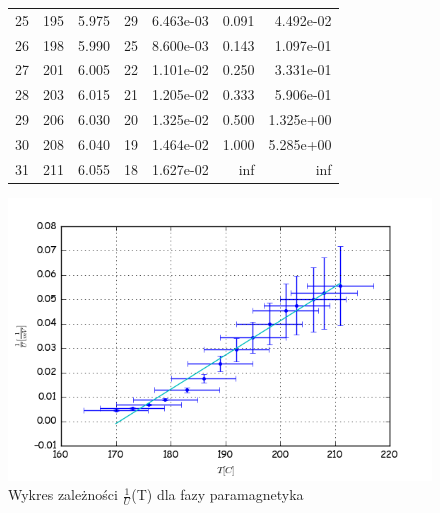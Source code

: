 \documentclass[a4paper,10pt]{article}
\begin{document}
\begin{figure}
\begin{tabular}{lrrrrrr}
25 &            195 &                  5.975 &                           29 &                           6.463e-03 &                                0.091 &                                   4.492e-02 \\
26 &            198 &                  5.990 &                           25 &                           8.600e-03 &                                0.143 &                                   1.097e-01 \\
27 &            201 &                  6.005 &                           22 &                           1.101e-02 &                                0.250 &                                   3.331e-01 \\
28 &            203 &                  6.015 &                           21 &                           1.205e-02 &                                0.333 &                                   5.906e-01 \\
29 &            206 &                  6.030 &                           20 &                           1.325e-02 &                                0.500 &                                   1.325e+00 \\
30 &            208 &                  6.040 &                           19 &                           1.464e-02 &                                1.000 &                                   5.285e+00 \\
31 &            211 &                  6.055 &                           18 &                           1.627e-02 &                                  inf &                                         inf \\
\bottomrule
\end{tabular}
\end{figure}
\begin{figure}[H]
  \includegraphics{./Curie_odwrotnosc.png}
  \caption{Wykres zależności $\frac{1}{U}$(T) dla fazy paramagnetyka}
\end{figure}
\end{document}
